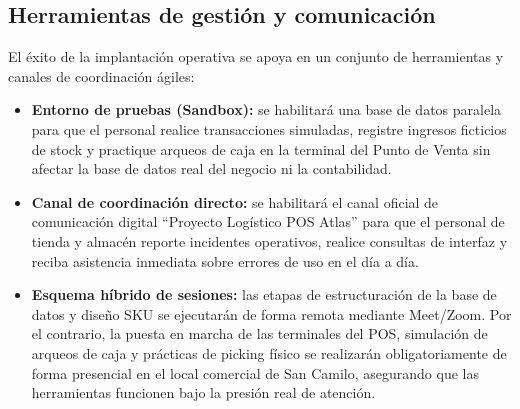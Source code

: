 \subsection{Herramientas de gestión y comunicación}
\begin{indentedsubsection}
El éxito de la implantación operativa se apoya en un conjunto de herramientas y canales de coordinación ágiles:

\begin{itemize}
    \item \textbf{Entorno de pruebas (Sandbox):} se habilitará una base de datos paralela para que el personal realice transacciones simuladas, registre ingresos ficticios de stock y practique arqueos de caja en la terminal del Punto de Venta sin afectar la base de datos real del negocio ni la contabilidad.
    \item \textbf{Canal de coordinación directo:} se habilitará el canal oficial de comunicación digital ``Proyecto Logístico POS Atlas'' para que el personal de tienda y almacén reporte incidentes operativos, realice consultas de interfaz y reciba asistencia inmediata sobre errores de uso en el día a día.
    \item \textbf{Esquema híbrido de sesiones:} las etapas de estructuración de la base de datos y diseño SKU se ejecutarán de forma remota mediante Meet/Zoom. Por el contrario, la puesta en marcha de las terminales del POS, simulación de arqueos de caja y prácticas de picking físico se realizarán obligatoriamente de forma presencial en el local comercial de San Camilo, asegurando que las herramientas funcionen bajo la presión real de atención.
\end{itemize}
\end{indentedsubsection}

